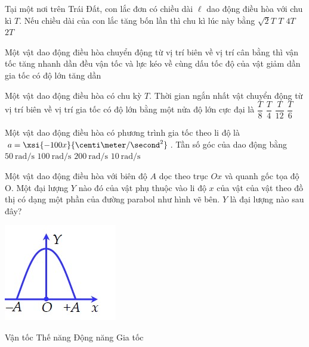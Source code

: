 \begin{ex}
	Tại một nơi trên Trái Đất, con lắc đơn có chiều dài $\ell$   dao động điều hòa với chu kì $T$. Nếu chiều dài của con lắc  tăng bốn lần thì chu kì lúc này bằng
	\choice
	{$\sqrt{2}T$}
	{$T$}
	{$4T$}
	{\True $2T$}
\end{ex}
\begin{ex}
	Một vật dao động điều hòa chuyển động từ vị trí biên về vị trí cân bằng thì
	\choice
	{vận tốc tăng nhanh dần đều}
	{\True vận tốc và lực kéo về cùng dấu}
	{tốc độ của vật giảm dần}
	{gia tốc có độ lớn tăng dần}
	\loigiai{}
\end{ex}
\begin{ex}
	Một vật dao động điều hòa có chu kỳ $T$. Thời gian ngắn nhất vật chuyển động từ vị trí biên về vị trí gia tốc có độ lớn bằng một nửa độ lớn cực đại là
	\choice
	{$\dfrac{T}{8}$}
	{$\dfrac{T}{4}$}
	{$\dfrac{T}{12}$}
	{\True $\dfrac{T}{6}$}
	\loigiai{}
\end{ex}
\begin{ex}
	Một vật dao động điều hòa có phương trình gia tốc theo li độ là $a =\xsi{-100x}{\centi\meter/\second^2}$. Tần số góc của dao động bằng
	\choice
	{$\SI{50}{\radian/\second}$}
	{$\SI{100}{\radian/\second}$}
	{$\SI{200}{\radian/\second}$}
	{\True $\SI{10}{\radian/\second}$}
\end{ex}
\begin{ex}
Một vật dao động điều hòa với biên độ $A$ dọc theo trục $Ox$ và quanh gốc tọa độ O. Một đại lượng $Y$ nào đó của vật phụ thuộc vào li độ $x$ của vật của vật theo đồ thị có dạng một phần của đường parabol như hình vẽ bên. $Y$ là đại lượng nào sau đây?	
\begin{center}
	\includegraphics[width=0.2\linewidth]{../figs/D11-004-1}
\end{center}
	\choice
	{Vận tốc}
	{Thế năng}
	{\True Động năng}
	{Gia tốc}
	\loigiai{}
\end{ex}
